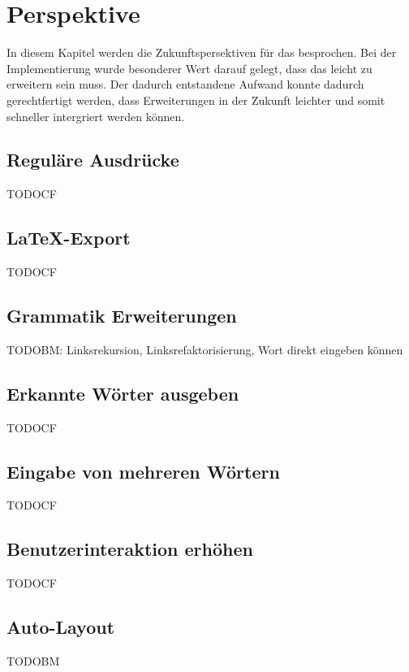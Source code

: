 

\chapter{Perspektive}\label{Perspective}

In diesem Kapitel werden die Zukunftspersektiven für das \gtitool besprochen.
Bei der Implementierung wurde besonderer Wert darauf gelegt, dass das \gtitool
leicht zu erweitern sein muss. Der dadurch entstandene Aufwand konnte dadurch
gerechtfertigt werden, dass Erweiterungen in der Zukunft leichter und somit
schneller intergriert werden können.

\section{Reguläre Ausdrücke}

TODOCF


\section{\LaTeX-Export}

TODOCF


\section{Grammatik Erweiterungen}

TODOBM: Linksrekursion, Linksrefaktorisierung, Wort direkt eingeben können


\section{Erkannte Wörter ausgeben}

TODOCF


\section{Eingabe von mehreren Wörtern}

TODOCF


\section{Benutzerinteraktion erhöhen}

TODOCF


\section{Auto-Layout}

TODOBM
